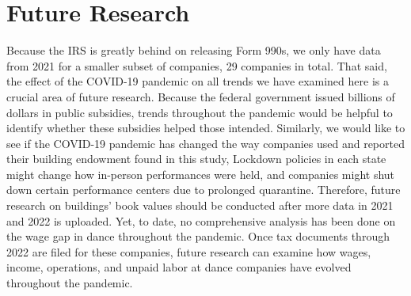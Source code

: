 \documentclass[Dance Data
Project,article,submit,moreauthors,pdftex]{mdpi}
\begin{document}
\hypertarget{future-research}{%
\section{Future Research}\label{future-research}}

Because the IRS is greatly behind on releasing Form 990s, we only have
data from 2021 for a smaller subset of companies, 29 companies in total.
That said, the effect of the COVID-19 pandemic on all trends we have
examined here is a crucial area of future research. Because the federal
government issued billions of dollars in public subsidies, trends
throughout the pandemic would be helpful to identify whether these
subsidies helped those intended. Similarly, we would like to see if the
COVID-19 pandemic has changed the way companies used and reported their
building endowment found in this study, Lockdown policies in each state
might change how in-person performances were held, and companies might
shut down certain performance centers due to prolonged quarantine.
Therefore, future research on buildings' book values should be conducted
after more data in 2021 and 2022 is uploaded. Yet, to date, no
comprehensive analysis has been done on the wage gap in dance throughout
the pandemic. Once tax documents through 2022 are filed for these
companies, future research can examine how wages, income, operations,
and unpaid labor at dance companies have evolved throughout the
pandemic.

%

\vspace{6pt}



\end{document}

